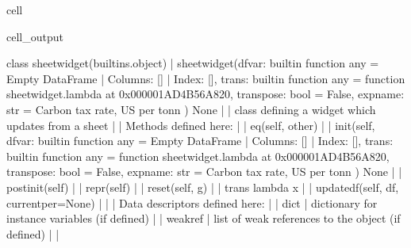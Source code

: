 \documentclass[letterpaper,10pt,english]{jupyterBook}
\begin{document}
\begin{sphinxuseclass}{cell}
\begin{sphinxVerbatimOutput}
\begin{sphinxuseclass}{cell_output}
\begin{sphinxVerbatim}[commandchars=\\\{\}]
    class sheetwidget(builtins.object)
     |  sheetwidget(df\PYGZus{}var: \PYGZlt{}built\PYGZhy{}in function any\PYGZgt{} = Empty DataFrame
     |  Columns: []
     |  Index: [], trans: \PYGZlt{}built\PYGZhy{}in function any\PYGZgt{} = \PYGZlt{}function sheetwidget.\PYGZlt{}lambda\PYGZgt{} at 0x000001AD4B56A820\PYGZgt{}, transpose: bool = False, expname: str = \PYGZsq{}Carbon tax rate, US\PYGZdl{} per tonn \PYGZsq{}) \PYGZhy{}\PYGZgt{} None
     |  
     |  class defining a widget which updates from a sheet
     |  
     |  Methods defined here:
     |  
     |  \PYGZus{}\PYGZus{}eq\PYGZus{}\PYGZus{}(self, other)
     |  
     |  \PYGZus{}\PYGZus{}init\PYGZus{}\PYGZus{}(self, df\PYGZus{}var: \PYGZlt{}built\PYGZhy{}in function any\PYGZgt{} = Empty DataFrame
     |  Columns: []
     |  Index: [], trans: \PYGZlt{}built\PYGZhy{}in function any\PYGZgt{} = \PYGZlt{}function sheetwidget.\PYGZlt{}lambda\PYGZgt{} at 0x000001AD4B56A820\PYGZgt{}, transpose: bool = False, expname: str = \PYGZsq{}Carbon tax rate, US\PYGZdl{} per tonn \PYGZsq{}) \PYGZhy{}\PYGZgt{} None
     |  
     |  \PYGZus{}\PYGZus{}post\PYGZus{}init\PYGZus{}\PYGZus{}(self)
     |  
     |  \PYGZus{}\PYGZus{}repr\PYGZus{}\PYGZus{}(self)
     |  
     |  reset(self, g)
     |  
     |  trans lambda x
     |  
     |  update\PYGZus{}df(self, df, current\PYGZus{}per=None)
     |  
     |  \PYGZhy{}\PYGZhy{}\PYGZhy{}\PYGZhy{}\PYGZhy{}\PYGZhy{}\PYGZhy{}\PYGZhy{}\PYGZhy{}\PYGZhy{}\PYGZhy{}\PYGZhy{}\PYGZhy{}\PYGZhy{}\PYGZhy{}\PYGZhy{}\PYGZhy{}\PYGZhy{}\PYGZhy{}\PYGZhy{}\PYGZhy{}\PYGZhy{}\PYGZhy{}\PYGZhy{}\PYGZhy{}\PYGZhy{}\PYGZhy{}\PYGZhy{}\PYGZhy{}\PYGZhy{}\PYGZhy{}\PYGZhy{}\PYGZhy{}\PYGZhy{}\PYGZhy{}\PYGZhy{}\PYGZhy{}\PYGZhy{}\PYGZhy{}\PYGZhy{}\PYGZhy{}\PYGZhy{}\PYGZhy{}\PYGZhy{}\PYGZhy{}\PYGZhy{}\PYGZhy{}\PYGZhy{}\PYGZhy{}\PYGZhy{}\PYGZhy{}\PYGZhy{}\PYGZhy{}\PYGZhy{}\PYGZhy{}\PYGZhy{}\PYGZhy{}\PYGZhy{}\PYGZhy{}\PYGZhy{}\PYGZhy{}\PYGZhy{}\PYGZhy{}\PYGZhy{}\PYGZhy{}\PYGZhy{}\PYGZhy{}\PYGZhy{}\PYGZhy{}\PYGZhy{}
     |  Data descriptors defined here:
     |  
     |  \PYGZus{}\PYGZus{}dict\PYGZus{}\PYGZus{}
     |      dictionary for instance variables (if defined)
     |  
     |  \PYGZus{}\PYGZus{}weakref\PYGZus{}\PYGZus{}
     |      list of weak references to the object (if defined)
     |  
     |  \PYGZhy{}\PYGZhy{}\PYGZhy{}\PYGZhy{}\PYGZhy{}\PYGZhy{}\PYGZhy{}\PYGZhy{}\PYGZhy{}\PYGZhy{}\PYGZhy{}\PYGZhy{}\PYGZhy{}\PYGZhy{}\PYGZhy{}\PYGZhy{}\PYGZhy{}\PYGZhy{}\PYGZhy{}\PYGZhy{}\PYGZhy{}\PYGZhy{}\PYGZhy{}\PYGZhy{}\PYGZhy{}\PYGZhy{}\PYGZhy{}\PYGZhy{}\PYGZhy{}\PYGZhy{}\PYGZhy{}\PYGZhy{}\PYGZhy{}\PYGZhy{}\PYGZhy{}\PYGZhy{}\PYGZhy{}\PYGZhy{}\PYGZhy{}\PYGZhy{}\PYGZhy{}\PYGZhy{}\PYGZhy{}\PYGZhy{}\PYGZhy{}\PYGZhy{}\PYGZhy{}\PYGZhy{}\PYGZhy{}\PYGZhy{}\PYGZhy{}\PYGZhy{}\PYGZhy{}\PYGZhy{}\PYGZhy{}\PYGZhy{}\PYGZhy{}\PYGZhy{}\PYGZhy{}\PYGZhy{}\PYGZhy{}\PYGZhy{}\PYGZhy{}\PYGZhy{}\PYGZhy{}\PYGZhy{}\PYGZhy{}\PYGZhy{}\PYGZhy{}\PYGZhy{}

\end{sphinxVerbatim}
\end{sphinxuseclass}
\end{sphinxVerbatimOutput}
\end{sphinxuseclass}
\end{document}
